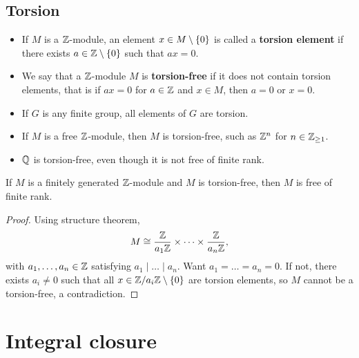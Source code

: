 \pagebreak

\subsection{Torsion}


\begin{definition}
\hfill
\begin{itemize}
\item If $ M $ is a $ \mathbb{Z} $-module, an element $ x \in M \setminus \left\{ 0 \right\} $ is called a \textbf{torsion element} if there exists $ a \in \mathbb{Z} \setminus \left\{ 0 \right\} $ such that $ ax = 0 $.
\item We say that a $ \mathbb{Z} $-module $ M $ is \textbf{torsion-free} if it does not contain torsion elements, that is if $ ax = 0 $ for $ a \in \mathbb{Z} $ and $ x \in M $, then $ a = 0 $ or $ x = 0 $.
\end{itemize}
\end{definition}

\begin{example*}
\hfill
\begin{itemize}
\item If $ G $ is any finite group, all elements of $ G $ are torsion.
\item If $ M $ is a free $ \mathbb{Z} $-module, then $ M $ is torsion-free, such as $ \mathbb{Z}^n $ for $ n \in \mathbb{Z}_{\ge 1} $.
\item $ \mathbb{Q} $ is torsion-free, even though it is not free of finite rank.
\end{itemize}
\end{example*}

\begin{proposition}
If $ M $ is a finitely generated $ \mathbb{Z} $-module and $ M $ is torsion-free, then $ M $ is free of finite rank.
\end{proposition}

\begin{proof}
Using structure theorem,
$$ M \cong \dfrac{\mathbb{Z}}{a_1\mathbb{Z}} \times \dots \times \dfrac{\mathbb{Z}}{a_n\mathbb{Z}}, $$
with $ a_1, \dots, a_n \in \mathbb{Z} $ satisfying $ a_1 \mid \dots \mid a_n $. Want $ a_1 = \dots = a_n = 0 $. If not, there exists $ a_i \ne 0 $ such that all $ x \in \mathbb{Z} / a_i\mathbb{Z} \setminus \left\{ 0 \right\} $ are torsion elements, so $ M $ cannot be a torsion-free, a contradiction.
\end{proof}

\pagebreak

\section{Integral closure}

